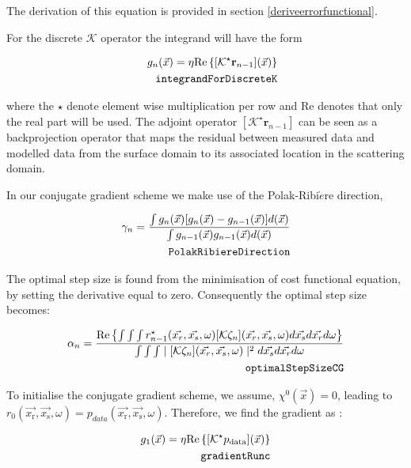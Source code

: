 \documentclass[10pt,a4paper]{article}
\newcommand{\real}[1]{\text{Re} \left\{ #1 \right\}}
\begin{document}
The derivation of this equation is provided in section
\ref{deriveerrorfunctional}.

For the discrete $\mathcal{K}$ operator the integrand will have the form

\begin{align} \label{eq:integrandForDiscreteK} g_n(\vec{x}) = \eta
\real{[\mathcal{K}^\star\mathbf{r}_{n-1}](\vec{x})}\\
\tag*{\texttt{integrandForDiscreteK}}
\end{align}

where the $\star$ denote element wise multiplication per row and Re
denotes that only the real part will be used.
The adjoint operator $[\mathcal{K}^\star\mathbf{r}_{n-1}]$ can be seen
as a backprojection operator that maps the residual between measured
data and modelled data from the surface domain to its associated
location in the scattering domain.

In our conjugate gradient scheme we make use of the
Polak-Ribi$\grave{e}$re direction,

\begin{align} \label{eq:PolakRibiereDirection} \gamma_n = \frac{\int
g_n(\vec{x})[g_n(\vec{x})-g_{n-1}(\vec{x})]d(\vec{x})}{\int
g_{n-1}(\vec{x}) g_{n-1}(\vec{x})d(\vec{x})}\\
\tag*{\texttt{PolakRibiereDirection}}
\end{align}

The optimal step size is found from the minimisation of cost
functional equation, by setting the derivative equal to zero.
Consequently the optimal step size becomes:

\begin{align} \label{eq:optimalStepSizeCG} \alpha_n = \frac {\real {\int \int
\int r^{\star}_{n-1}( \vec{x_r},\vec{x_s},\omega)[\mathcal{K}
\zeta_n](\vec{x_r},\vec{x_s},\omega)d\vec{x_s}d\vec{x_r}d\omega}}{\int
\int \int \mid[\mathcal{K}
\zeta_n](\vec{x_r},\vec{x_s},\omega) \mid^2
d\vec{x_s}d\vec{x_r}d\omega}\\
\tag*{\texttt{optimalStepSizeCG}}
\end{align}

To initialise the conjugate gradient scheme, we assume, $\chi^0
(\vec{x}) = 0$, leading to
$r_0(\vec{x_\text{r}},\vec{x_\text{s}},\omega) =
p_{data}(\vec{x_\text{r}},\vec{x_\text{s}},\omega)$.
Therefore, we find the gradient as :

\begin{align} \label{eq:gradientFunc} g_1(\vec{x}) = \eta
\real{[\mathcal{K}^\star p_\text{data}](\vec{x})}\\
\tag*{\texttt{gradientRunc}}
\end{align}
\end{document}
